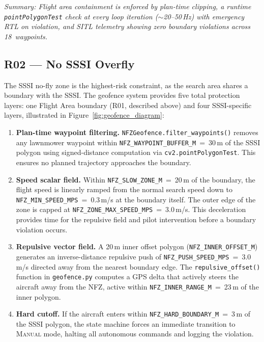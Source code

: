 \noindent\textit{Summary: Flight area containment is enforced by plan-time clipping, a runtime \texttt{pointPolygonTest} check at every loop iteration (${\sim}$20--50\,Hz) with emergency RTL on violation, and SITL telemetry showing zero boundary violations across 18~waypoints.}

\subsection{R02 --- No SSSI Overfly}

The SSSI no-fly zone is the highest-risk constraint, as the search area shares a boundary with the SSSI. The geofence system provides five total protection layers: one Flight Area boundary (R01, described above) and four SSSI-specific layers, illustrated in Figure~\ref{fig:geofence_diagram}:

\begin{enumerate}
    \item \textbf{Plan-time waypoint filtering.} \texttt{NFZGeofence.filter\_waypoints()} removes any lawnmower waypoint within \texttt{NFZ\_WAYPOINT\_BUFFER\_M}~=~30\,m of the SSSI polygon using signed-distance computation via \texttt{cv2.pointPolygonTest}. This ensures no planned trajectory approaches the boundary.

    \item \textbf{Speed scalar field.} Within \texttt{NFZ\_SLOW\_ZONE\_M}~=~20\,m of the boundary, the flight speed is linearly ramped from the normal search speed down to \texttt{NFZ\_MIN\_SPEED\_MPS}~=~0.3\,m/s at the boundary itself. The outer edge of the zone is capped at \texttt{NFZ\_ZONE\_MAX\_SPEED\_MPS}~=~3.0\,m/s. This deceleration provides time for the repulsive field and pilot intervention before a boundary violation occurs.

    \item \textbf{Repulsive vector field.} A 20\,m inner offset polygon (\texttt{NFZ\_INNER\_OFFSET\_M}) generates an inverse-distance repulsive push of \texttt{NFZ\_PUSH\_SPEED\_MPS}~=~3.0\,m/s directed away from the nearest boundary edge. The \texttt{repulsive\_offset()} function in \texttt{geofence.py} computes a GPS delta that actively steers the aircraft away from the NFZ, active within \texttt{NFZ\_INNER\_RANGE\_M}~=~23\,m of the inner polygon.

    \item \textbf{Hard cutoff.} If the aircraft enters within \texttt{NFZ\_HARD\_BOUNDARY\_M}~=~3\,m of the SSSI polygon, the state machine forces an immediate transition to \textsc{Manual} mode, halting all autonomous commands and logging the violation.
\end{enumerate}

